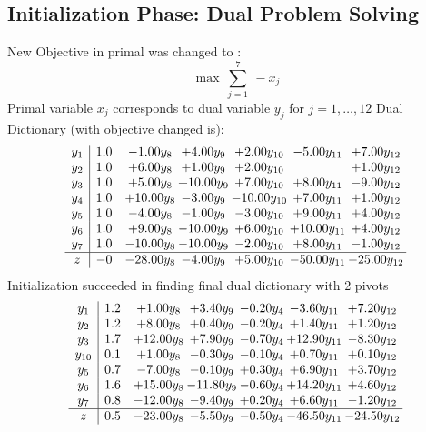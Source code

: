 \documentclass[8pt]{article}
\begin{document}
\subsection{Initialization Phase: Dual Problem Solving}
New Objective in primal was changed to : \[ \max\ \sum_{j=1}^{7}\ - x_j \] 
Primal variable $x_j$ corresponds to dual variable $y_j$ for $j = 1,\ldots,12$
Dual Dictionary (with objective changed is): 
\[\begin{array}{c| c c@{\hskip 2pt} c@{\hskip 2pt} c@{\hskip 2pt} c@{\hskip 2pt} c@{\hskip 2pt} }
 y_{1}   &  1.0 & -1.00 y_{8} & +  4.00 y_{9} & +  2.00 y_{10} & -5.00 y_{11} & +  7.00 y_{12}\\
 y_{2}   &  1.0 & +  6.00 y_{8} & +  1.00 y_{9} & +  2.00 y_{10} &   & +  1.00 y_{12}\\
 y_{3}   &  1.0 & +  5.00 y_{8} & + 10.00 y_{9} & +  7.00 y_{10} & +  8.00 y_{11} & -9.00 y_{12}\\
 y_{4}   &  1.0 & + 10.00 y_{8} & -3.00 y_{9} & -10.00 y_{10} & +  7.00 y_{11} & +  1.00 y_{12}\\
 y_{5}   &  1.0 & -4.00 y_{8} & -1.00 y_{9} & -3.00 y_{10} & +  9.00 y_{11} & +  4.00 y_{12}\\
 y_{6}   &  1.0 & +  9.00 y_{8} & -10.00 y_{9} & +  6.00 y_{10} & + 10.00 y_{11} & +  4.00 y_{12}\\
 y_{7}   &  1.0 & -10.00 y_{8} & -10.00 y_{9} & -2.00 y_{10} & +  8.00 y_{11} & -1.00 y_{12}\\
\hline
z    &  -0 & -28.00 y_{8} & -4.00 y_{9} & +  5.00 y_{10} & -50.00 y_{11} & -25.00 y_{12}\\
\end{array}\]
Initialization succeeded in finding final dual dictionary with 2 pivots
\[\begin{array}{c| c c@{\hskip 2pt} c@{\hskip 2pt} c@{\hskip 2pt} c@{\hskip 2pt} c@{\hskip 2pt} }
 y_{1}   &  1.2 & +  1.00 y_{8} & +  3.40 y_{9} & -0.20 y_{4} & -3.60 y_{11} & +  7.20 y_{12}\\
 y_{2}   &  1.2 & +  8.00 y_{8} & +  0.40 y_{9} & -0.20 y_{4} & +  1.40 y_{11} & +  1.20 y_{12}\\
 y_{3}   &  1.7 & + 12.00 y_{8} & +  7.90 y_{9} & -0.70 y_{4} & + 12.90 y_{11} & -8.30 y_{12}\\
 y_{10}   &  0.1 & +  1.00 y_{8} & -0.30 y_{9} & -0.10 y_{4} & +  0.70 y_{11} & +  0.10 y_{12}\\
 y_{5}   &  0.7 & -7.00 y_{8} & -0.10 y_{9} & +  0.30 y_{4} & +  6.90 y_{11} & +  3.70 y_{12}\\
 y_{6}   &  1.6 & + 15.00 y_{8} & -11.80 y_{9} & -0.60 y_{4} & + 14.20 y_{11} & +  4.60 y_{12}\\
 y_{7}   &  0.8 & -12.00 y_{8} & -9.40 y_{9} & +  0.20 y_{4} & +  6.60 y_{11} & -1.20 y_{12}\\
\hline
z    &  0.5 & -23.00 y_{8} & -5.50 y_{9} & -0.50 y_{4} & -46.50 y_{11} & -24.50 y_{12}\\
\end{array}\]
\end{document}
